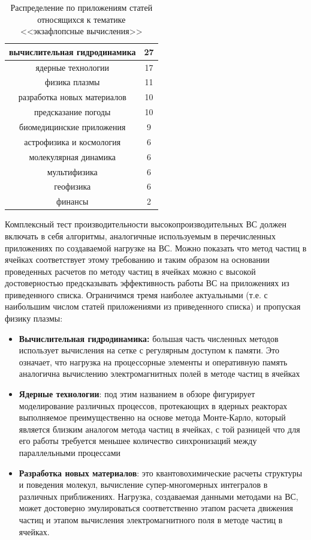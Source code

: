 \begin{table}[ht]
	\caption{Распределение по приложениям статей относящихся к тематике <<экзафлопсные вычисления>>}
	\begin{center}
		\begin{tabular}{|c|c|}
			\hline
			вычислительная гидродинамика & 27  \\ \hline 
			ядерные технологии & 17       \\ \hline  
			физика плазмы & 11  \\ \hline 
			разработка новых материалов & 10  \\ \hline 
			предсказание погоды & 10 \\ \hline 
			биомедицинские приложения & 9 \\ \hline 
			астрофизика и космология & 6  \\ \hline 
			молекулярная динамика   & 6   \\ \hline 
			мультифизика & 6              \\ \hline 
			геофизика & 6  \\ \hline 
			финансы & 2  \\ \hline 
		\end{tabular}
	\end{center}
	\label{tab_physics}
\end{table}
Комплексный тест производительности высокопроизводительных ВС должен включать в себя алгоритмы, аналогичные используемым в перечисленных приложениях по создаваемой нагрузке на ВС. Можно показать что метод частиц в ячейках соответствует этому требованию и таким образом на основании проведенных расчетов по методу частиц в ячейках можно с высокой достоверностью предсказывать эффективность работы ВС на приложениях из приведенного списка. Ограничимся тремя наиболее актуальными (т.е. с наибольшим числом статей приложениями из приведенного списка) и пропуская физику плазмы:
\begin{itemize}
	\item \textbf{Вычислительная гидродинамика:} большая часть численных методов использует вычисления на сетке с регулярным доступом к памяти. Это означает, что нагрузка на процессорные элементы и оперативную память аналогична вычислению электромагнитных полей в методе частиц в ячейках
	\item \textbf{Ядерные технологии}: под этим названием в обзоре фигурирует моделирование различных процессов, протекающих в ядерных реакторах выполняемое преимущественно на основе метода Монте-Карло, который является близким аналогом метода частиц в ячейках, с той разницей что для его работы требуется меньшее количество синхронизаций между параллельными процессами
	\item \textbf{Разработка новых материалов}: это квантовохимические расчеты структуры и поведения молекул, вычисление супер-многомерных интегралов в различных приближениях. Нагрузка, создаваемая данными методами на ВС, может достоверно эмулироваться соответственно этапом расчета движения частиц и этапом вычисления электромагнитного поля в методе частиц в ячейках.
\end{itemize}	    	
